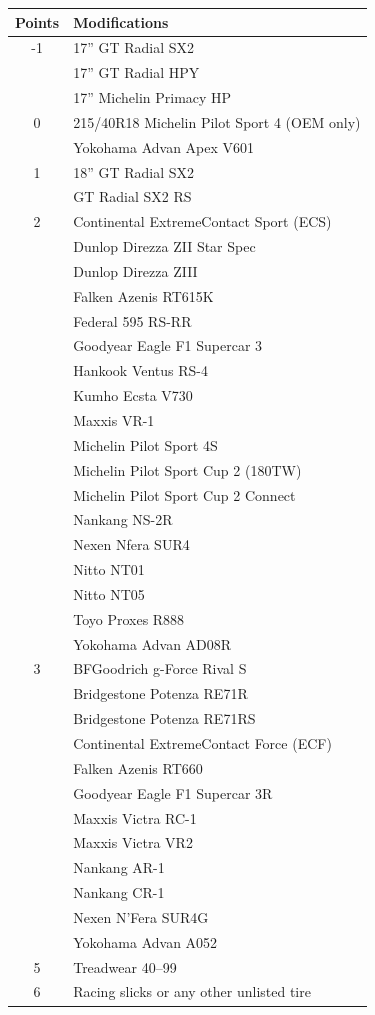 \documentclass{article}
\newenvironment{legallist}{
    \begin{enumerate}[label*=\arabic*.]
}{
    \end{enumerate}
}
\newenvironment{mods}{
    \begin{longtable}{c p{6in}}
    \toprule
    \textbf{Points} & \textbf{Modifications} \\
    \midrule
}{
    \bottomrule
    \end{longtable}
}
\begin{document}
\begin{legallist}
			\begin{mods}
				-1 & 17” GT Radial SX2  \\ 
				& 17” GT Radial HPY  \\ 
				& 17” Michelin Primacy HP  \\ 
				\midrule
				0 & 215/40R18 Michelin Pilot Sport 4 (OEM only)  \\
				& Yokohama Advan Apex V601 \\
				\midrule
				1 & 18” GT Radial SX2 \\
				& GT Radial SX2 RS \\
				\midrule
				2 & Continental ExtremeContact Sport (ECS) \\
				& Dunlop Direzza ZII Star Spec \\
				& Dunlop Direzza ZIII \\
				& Falken Azenis RT615K \\
				& Federal 595 RS-RR \\
				& Goodyear Eagle F1 Supercar 3 \\
				& Hankook Ventus RS-4 \\
				& Kumho Ecsta V730 \\
				& Maxxis VR-1 \\
				& Michelin Pilot Sport 4S \\
				& Michelin Pilot Sport Cup 2 (180TW) \\
				& Michelin Pilot Sport Cup 2 Connect \\
				& Nankang NS-2R \\
				& Nexen Nfera SUR4 \\
				& Nitto NT01 \\
				& Nitto NT05 \\
				& Toyo Proxes R888 \\
				& Yokohama Advan AD08R \\
				\midrule
				3 & BFGoodrich g-Force Rival S \\
				& Bridgestone Potenza RE71R \\
				& Bridgestone Potenza RE71RS \\
				& Continental ExtremeContact Force (ECF) \\
				& Falken Azenis RT660 \\
				& Goodyear Eagle F1 Supercar 3R \\
				& Maxxis Victra RC-1 \\
				& Maxxis Victra VR2 \\
				& Nankang AR-1 \\
				& Nankang CR-1 \\
				& Nexen N’Fera SUR4G \\
				& Yokohama Advan A052 \\
				\midrule
				5 & Treadwear 40–99 \\
				\midrule
				6 & Racing slicks or any other unlisted tire \\
			\end{mods}
						

\end{legallist}
\end{document}
